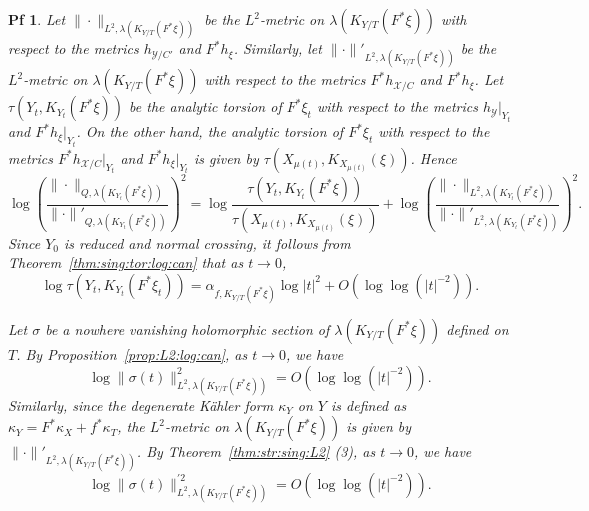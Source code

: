 \documentclass[10pt,a4paper]{amsart}
\newtheorem{pf}{Pf}
\begin{document}
\begin{pf}
Let $\|\cdot\|_{L^{2},\lambda(K_{Y/T}(F^{*}\xi) )}$ be the $L^{2}$-metric on $\lambda(K_{Y/T}(F^{*}\xi))$ with respect to the metrics 
$h_{{\mathcal Y}/C'}$ and $F^{*}h_{\xi}$. Similarly, let $\|\cdot\|'_{L^{2},\lambda(K_{Y/T}(F^{*}\xi))}$ be the $L^{2}$-metric on 
$\lambda(K_{Y/T}(F^{*}\xi))$ with respect to the metrics $F^{*}h_{{\mathcal X}/C}$ and $F^{*}h_{\xi}$.
Let $\tau(Y_{t}, K_{Y_{t}}(F^{*}\xi))$ be the analytic torsion of $F^{*}\xi_{t}$ with respect to the metrics $h_{\mathcal Y}|_{Y_{t}}$ and 
$F^{*}h_{\xi}|_{Y_{t}}$.
On the other hand, the analytic torsion of $F^{*}\xi_{t}$ with respect to the metrics $F^{*}h_{{\mathcal X}/C}|_{Y_{t}}$ and 
$F^{*}h_{\xi}|_{Y_{t}}$ is given by $\tau(X_{\mu(t)}, K_{X_{\mu(t)}}(\xi))$. Hence 
\begin{equation}
\label{eqn:comparison:Quillen:1}
\log\left(\frac{\|\cdot\|_{Q,\lambda(K_{Y_{t}}(F^{*}\xi))}}{\|\cdot\|'_{Q,\lambda(K_{Y_{t}}(F^{*}\xi))}}\right)^{2}
=
\log\frac{\tau(Y_{t}, K_{Y_{t}}(F^{*}\xi))}{\tau(X_{\mu(t)}, K_{X_{\mu(t)}}(\xi))}
+
\log\left(\frac{\|\cdot\|_{L^{2},\lambda(K_{Y_{t}}(F^{*}\xi))}}{\|\cdot\|'_{L^{2},\lambda(K_{Y_{t}}(F^{*}\xi))}}\right)^{2}.
\end{equation}
Since $Y_{0}$ is reduced and normal crossing, it follows from Theorem~\ref{thm:sing:tor:log:can} that as $t \to 0$,
\begin{equation}
\label{eqn:asymptotics:torsion:1}
\log\tau(Y_{t}, K_{Y_{t}}(F^{*}\xi_{t})) = \alpha_{f, K_{Y/T}(F^{*}\xi)} \log|t|^{2} + O\left( \log\log (| t |^{-2}) \right).
\end{equation}
\par
Let $\sigma$ be a nowhere vanishing holomorphic section of $\lambda(K_{Y/T}(F^{*}\xi))$ defined on $T$. 
By Proposition~\ref{prop:L2:log:can}, as $t\to0$, we have
\begin{equation}
\label{eqn:estimate:L2:metric:1}
\log\|\sigma(t)\|_{L^{2},\lambda(K_{Y/T}(F^{*}\xi))}^{2} = O\left( \log\log(| t |^{-2}) \right).
\end{equation}
Similarly, since the degenerate K\"ahler form $\kappa_{Y}$ on $Y$ is defined as $\kappa_{Y} = F^{*}\kappa_{X} + f^{*}\kappa_{T}$, 
the $L^{2}$-metric on $\lambda(K_{Y/T}(F^{*}\xi))$ is given by $\| \cdot \|'_{L^{2},\lambda(K_{Y/T}(F^{*}\xi))}$.
By Theorem~\ref{thm:str:sing:L2} (3), as $t \to 0$, we have
\begin{equation}
\label{eqn:estimate:L2:metric:2}
\log\|\sigma(t)\|^{\prime 2}_{L^{2},\lambda(K_{Y/T}(F^{*}\xi))} = O\left( \log\log(| t |^{-2}) \right).

\end{equation}
\end{pf}
\end{document}
